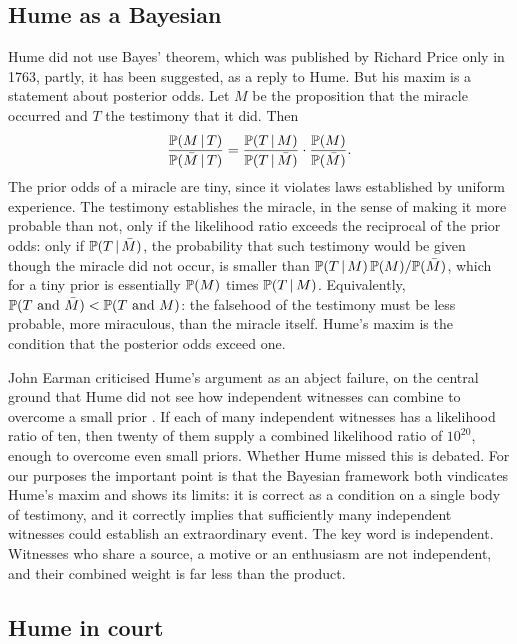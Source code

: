 \subsection{Hume as a Bayesian}

Hume did not use Bayes' theorem, which was published by Richard Price only in 1763, partly, it has been suggested, as a reply to Hume. But his maxim is a statement about posterior odds. Let $M$ be the proposition that the miracle occurred and $T$ the testimony that it did. Then
\begin{equation}
\frac{\mathbb{P}(M\,\vert\, T)}{\mathbb{P}(\bar M\,\vert\, T)} = \frac{\mathbb{P}(T\,\vert\, M)}{\mathbb{P}(T\,\vert\, \bar M)}\cdot\frac{\mathbb{P}(M)}{\mathbb{P}(\bar M)} .
\end{equation}
The prior odds of a miracle are tiny, since it violates laws established by uniform experience. The testimony establishes the miracle, in the sense of making it more probable than not, only if the likelihood ratio exceeds the reciprocal of the prior odds: only if $\mathbb{P}(T\,\vert\,\bar M)$, the probability that such testimony would be given though the miracle did not occur, is smaller than $\mathbb{P}(T\,\vert\, M)\,\mathbb{P}(M)/\mathbb{P}(\bar M)$, which for a tiny prior is essentially $\mathbb{P}(M)$ times $\mathbb{P}(T\,\vert\, M)$. Equivalently, $\mathbb{P}(T\text{ and }\bar M)<\mathbb{P}(T\text{ and }M)$: the falsehood of the testimony must be less probable, more miraculous, than the miracle itself. Hume's maxim is the condition that the posterior odds exceed one.

John Earman criticised Hume's argument as an abject failure, on the central ground that Hume did not see how independent witnesses can combine to overcome a small prior \citep{earman2000}. If each of many independent witnesses has a likelihood ratio of ten, then twenty of them supply a combined likelihood ratio of $10^{20}$, enough to overcome even small priors. Whether Hume missed this is debated. For our purposes the important point is that the Bayesian framework both vindicates Hume's maxim and shows its limits: it is correct as a condition on a single body of testimony, and it correctly implies that sufficiently many independent witnesses could establish an extraordinary event. The key word is independent. Witnesses who share a source, a motive or an enthusiasm are not independent, and their combined weight is far less than the product.

\subsection{Hume in court}


